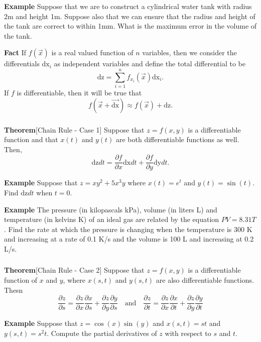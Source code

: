 \begin{frame}[fragile]\frametitle{}
\textbf{Example}
Suppose that we are to construct a cylindrical water tank with radius 2m and height 1m.  Suppose also that we can ensure that the radius and height of the tank are correct to within 1mm.  What is the maximum error in the volume of the tank.
 

\textbf{Fact}
If $f(\vec{x})$ is a real valued function of $n$ variables, then we consider the differentials $\text{dx}_i$ as independent variables and define the total differential to be 
$$ \text{dz} = \sum_{i=1}^n f_{x_i}(\vec{x})\text{dx}_i.$$ 
If $f$ is differentiable, then it will be true that 
$$f(\vec{x}+\vec{\text{dx}})\approx f(\vec{x})+\text{dz}.$$

\end{frame}



\begin{frame}[fragile]\frametitle{}
\textbf{Theorem}[Chain Rule - Case 1]
Suppose that $z=f(x,y)$ is a differentiable function and that $x(t)$ and $y(t)$ are both differentiable functions as well.  Then,
$$
  \text{dz}dt = \frac{\partial f}{\partial x} \text{dx}dt + \frac{\partial f}{\partial y}\text{dy}dt.
$$
  

\textbf{Example}
Suppose that $z=xy^2 + 5x^3y$ where $x(t)=e^t$ and $y(t)=\sin(t)$.  Find $\text{dz}dt$ when $t=0$.
  

\textbf{Example}
The pressure (in kilopascals kPa), volume (in liters L) and temperature (in kelvins K) of an ideal gas are related by the equation $PV=8.31 T$.  Find the rate at which the pressure is changing when the temperature is 300 K and increasing at a rate of 0.1 K/s and the volume is 100 L and increasing at 0.2 L/s.

\end{frame}


\begin{frame}[fragile]\frametitle{}
\textbf{Theorem}[Chain Rule - Case 2]
Suppose that $z=f(x,y)$ is a differentiable function of $x$ and $y$, where $x(s,t)$ and $y(s,t)$ are also differentiable functions.  Thesn
$$
\frac{\partial z}{\partial s} = \frac{\partial z}{\partial x}\frac{\partial x}{\partial s} + \frac{\partial z}{\partial y}\frac{\partial y}{\partial s} 
\quad\mbox{and}\quad
\frac{\partial z}{\partial t} = \frac{\partial z}{\partial x}\frac{\partial x}{\partial t} + \frac{\partial z}{\partial y}\frac{\partial y}{\partial t}
$$
 

\textbf{Example}
Suppose that $z=\cos(x)\sin(y)$ and $x(s,t)= st$ and $y(s,t)=s^2t$.  Compute the partial derivatives of $z$ with respect to $s$ and $t$.

\end{frame}



